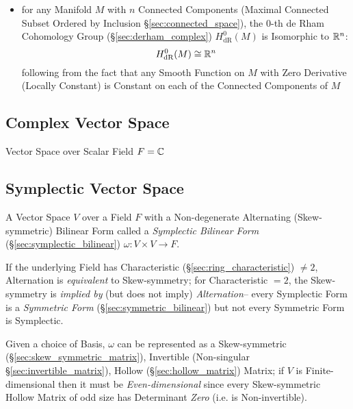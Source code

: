 \begin{itemize}
  \item for any Manifold $M$ with $n$ Connected Components (Maximal Connected
    Subset Ordered by Inclusion \S\ref{sec:connected_space}), the $0$-th de Rham
    Cohomology Group (\S\ref{sec:derham_complex}) $H_{\mathrm{dR}}^0(M)$ is
    Isomorphic to $\mathbb{R}^n$:
    \[
      H_{\mathrm{dR}}^0(M) \cong \mathbb{R}^n
    \]
    following from the fact that any Smooth Function on $M$ with Zero Derivative
    (Locally Constant) is Constant on each of the Connected Components of $M$
\end{itemize}


\subsection{Complex Vector Space}\label{sec:complex_vector_space}

Vector Space over Scalar Field $F = \mathbb{C}$



\subsection{Symplectic Vector Space}\label{sec:symplectic_vectorspace}

A Vector Space $V$ over a Field $F$ with a Non-degenerate Alternating
(Skew-symmetric) Bilinear Form called a \emph{Symplectic Bilinear Form}
(\S\ref{sec:symplectic_bilinear}) $\omega : V \times V \rightarrow F$.

If the underlying Field has Characteristic (\S\ref{sec:ring_characteristic})
$\neq 2$, Alternation is \emph{equivalent} to Skew-symmetry; for Characteristic
$=2$, the Skew-symmetry is \emph{implied by} (but does not imply)
\emph{Alternation}-- every Symplectic Form is a \emph{Symmetric Form}
(\S\ref{sec:symmetric_bilinear}) but not every Symmetric Form is Symplectic.

Given a choice of Basis, $\omega$ can be represented as a Skew-symmetric
(\S\ref{sec:skew_symmetric_matrix}), Invertible (Non-singular
\S\ref{sec:invertible_matrix}), Hollow (\S\ref{sec:hollow_matrix}) Matrix; if
$V$ is Finite-dimensional then it must be \emph{Even-dimensional} since every
Skew-symmetric Hollow Matrix of odd size has Determinant \emph{Zero} (i.e. is
Non-invertible).

